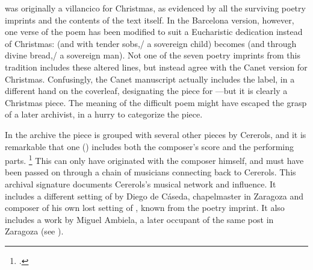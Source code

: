 
 was originally a villancico for Christmas, as
evidenced by all the surviving poetry imprints and the contents of the text
itself.
In the Barcelona version, however, one verse of the poem has been modified to
suit a Eucharistic dedication instead of Christmas:  (and with tender sobs,/ a sovereign child) becomes
 (and through divine bread,/
a sovereign man).
Not one of the seven poetry imprints from this tradition includes these altered
lines, but instead agree with the Canet version for Christmas.
Confusingly, the Canet manuscript actually includes the label, in a different
hand on the coverleaf, designating the piece for ---but it is clearly a Christmas piece.
The meaning of the difficult poem might have escaped the grasp of a later
archivist, in a hurry to categorize the piece.


In the archive the piece is grouped with several other pieces by Cererols, and
it is remarkable that one () includes both
the composer's score and the performing parts.%
    \footnote{.}
This can only have originated with the composer himself, and must have been
passed on through a chain of musicians connecting back to Cererols.
This archival signature documents Cererols's musical network and influence.
It includes a different setting of  by Diego
de Cáseda, chapelmaster in Zaragoza and composer of his own lost setting of
, known from the poetry imprint.
It also includes a work by Miguel Ambiela, a later occupant of the same post in
Zaragoza (see ).


